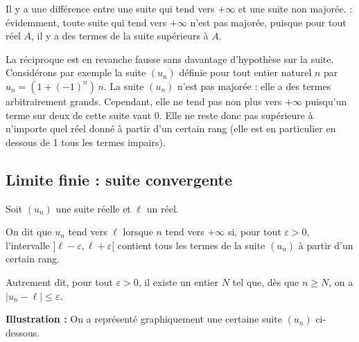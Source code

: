 \documentclass[11pt,fleqn]{book} %
\begin{document}
Il y a une différence entre une suite qui tend vers $+\infty$ et une suite non majorée. : évidemment, toute suite qui tend vers $+\infty$ n'est pas majorée, puisque pour tout réel $A$, il y a des termes de la suite supérieurs à $A$.

La réciproque est en revanche fausse sans davantage d'hypothèse sur la suite. Considérons par exemple la suite $(u_n)$ définie pour tout entier naturel $n$ par $u_n=(1+(-1)^n) \, n$. La suite $(u_n)$ n'est pas majorée : elle a des termes arbitrairement grands. Cependant, elle ne tend pas non plus vers $+\infty$ puisqu'un terme sur deux de cette suite vaut 0. Elle ne reste donc pas supérieure à n'importe quel réel donné à partir d'un certain rang (elle est en particulier en dessous de 1 tous les termes impairs).

\subsection{Limite finie : suite convergente}

\begin{definition}Soit $(u_n)$ une suite réelle et $\ell$ un réel. 

On dit que $u_n$ tend vers $\ell$ lorsque $n$ tend vers $+\infty$ si, pour tout $\varepsilon >0$, l'intervalle $] \ell- \varepsilon, \ell+\varepsilon [$ contient tous les termes de la suite $(u_n)$ à partir d'un certain rang.

Autrement dit, pour tout $\varepsilon >0$, il existe un entier $N$ tel que, dès que $n\geqslant N$, on a $|u_n- \ell | \leqslant \varepsilon$.\end{definition}

\textbf{Illustration :} On a représenté graphiquement une certaine suite $(u_n)$ ci-dessous. \begin{center}

\end{center}
\end{document}
